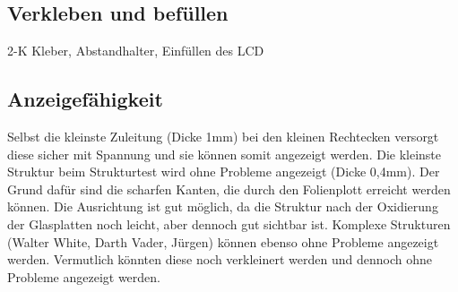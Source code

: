\subsection{Verkleben und befüllen}
2-K Kleber, Abstandhalter, Einfüllen des LCD
\subsection{Anzeigefähigkeit}
Selbst die kleinste Zuleitung (Dicke 1mm) bei den kleinen Rechtecken versorgt diese sicher mit Spannung und sie können somit angezeigt werden. Die kleinste Struktur beim Strukturtest wird ohne Probleme angezeigt (Dicke 0,4mm). Der Grund dafür sind die scharfen Kanten, die durch den Folienplott erreicht werden können. Die Ausrichtung ist gut möglich, da die Struktur nach der Oxidierung der Glasplatten noch leicht, aber dennoch gut sichtbar ist. Komplexe Strukturen (Walter White, Darth Vader, Jürgen) können ebenso ohne Probleme angezeigt werden. Vermutlich könnten diese noch verkleinert werden und dennoch ohne Probleme angezeigt werden.

